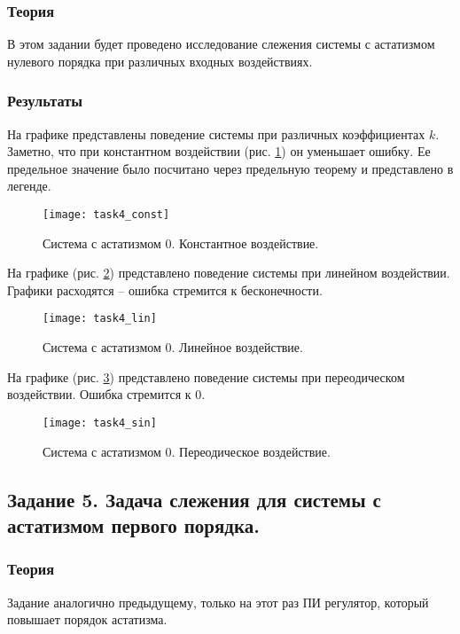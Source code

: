 \documentclass[16pt]{article}
\begin{document}
\subsubsection{Теория}
В этом задании будет проведено исследование слежения системы с астатизмом нулевого порядка  при различных входных воздействиях. 
\subsubsection{Результаты}
На графике представлены поведение системы при различных коэффициентах \(k\). Заметно, что при константном воздействии (рис. \ref{fig:fig4}) он уменьшает ошибку. Ее предельное значение было посчитано через предельную теорему и представлено в легенде.
\begin{figure}[h!]
    \centering
    \texttt{[image: task4\_const]}
    \caption{Система с астатизмом 0. Константное воздействие.}
    \label{fig:fig4}
\end{figure}

На графике (рис. \ref{fig:fig5}) представлено поведение системы при линейном воздействии. Графики расходятся -- ошибка стремится к бесконечности. 
\begin{figure}[h!]
    \centering
    \texttt{[image: task4\_lin]}
    \caption{Система с астатизмом 0. Линейное воздействие.}
    \label{fig:fig5}
\end{figure}

На графике (рис. \ref{fig:fig6}) представлено поведение системы при переодическом воздействии. Ошибка стремится к 0. 
\begin{figure}[h!]
    \centering
    \texttt{[image: task4\_sin]}
    \caption{Система с астатизмом 0. Переодическое воздействие.}
    \label{fig:fig6}
\end{figure}
\pagebreak

\subsection{Задание 5. Задача слежения для системы с астатизмом первого порядка.}

\subsubsection{Теория}
Задание аналогично предыдущему, только на этот раз ПИ регулятор, который повышает порядок астатизма.
\end{document}
